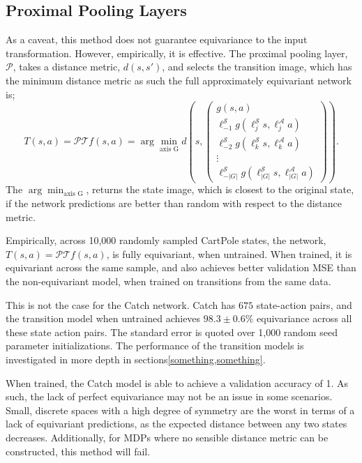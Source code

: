 \subsection{Proximal Pooling Layers}\label{sec:proximal_pool}
As a caveat, this method does not guarantee equivariance to the input transformation. However, empirically, it is effective. The proximal pooling layer, $\mathcal{P}$, takes a distance metric, $d(s, s')$, and selects the transition image, which has the minimum distance metric as such the full approximately equivariant network is;
\begin{equation}
	T(s, a) = \mathcal{P}\mathcal{T}f(s, a)  =\arg \min_\text{axis G} d \left (s,  \begin{pmatrix}
			g(s, a)                                                          \\
			\ell_{-1}^\mathcal{S}g(\ell_j^\mathcal{S}s,\ell^\mathcal{A}_ja)  \\
			\ell_{-2}^\mathcal{S}g(\ell^\mathcal{S}_ks, \ell^\mathcal{A}_ka) \\
			\vdots                                                           \\
			\ell_{-|G|}^\mathcal{S}g(\ell_{|G|}^\mathcal{S}s, \ell^\mathcal{A}_{|G|}a)
		\end{pmatrix}
	\right ).
\end{equation}
The $\arg \min_\text{axis G}$, returns the state image, which is closest to the original state, if the network predictions are better than random with respect to the distance metric.

Empirically, across 10,000 randomly sampled CartPole states, the network, $T(s, a)= \mathcal{P}\mathcal{T}f(s,a)$, is fully equivariant, when untrained. When trained, it is equivariant across the same sample, and also achieves better validation MSE than the non-equivariant model, when trained on transitions from the same data.

This is not the case for the Catch network. Catch has $675$ state-action pairs, and the transition model when untrained achieves $98.3 \pm 0.6\%$ equivariance across all these state action pairs. The standard error is quoted over 1,000 random seed parameter initializations. The performance of the transition models is investigated in more depth in sections\ref{something,something}.

When trained, the Catch model is able to achieve a validation accuracy of 1. As such, the lack of perfect equivariance may not be an issue in some scenarios. Small, discrete spaces with a high degree of symmetry are the worst in terms of a lack of equivariant predictions, as the expected distance between any two states decreases. Additionally, for MDPs where no sensible distance metric can be constructed, this method will fail.

